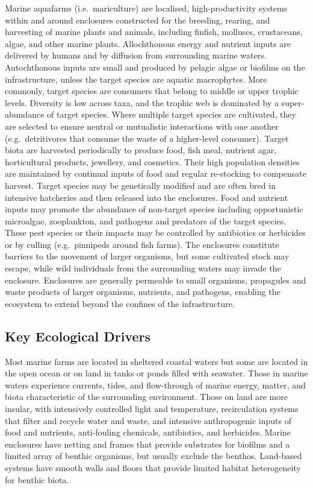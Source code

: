 \documentclass[
  letterpaper,
  DIV=11,
  numbers=noendperiod]{scrartcl}
\begin{document}
Marine aquafarms (i.e.~mariculture) are localised, high-productivity
systems within and around enclosures constructed for the breeding,
rearing, and harvesting of marine plants and animals, including finfish,
molluscs, crustaceans, algae, and other marine plants. Allochthonous
energy and nutrient inputs are delivered by humans and by diffusion from
surrounding marine waters. Autochthonous inputs are small and produced
by pelagic algae or biofilms on the infrastructure, unless the target
species are aquatic macrophytes. More commonly, target species are
consumers that belong to middle or upper trophic levels. Diversity is
low across taxa, and the trophic web is dominated by a super-abundance
of target species. Where multiple target species are cultivated, they
are selected to ensure neutral or mutualistic interactions with one
another (e.g.~detritivores that consume the waste of a higher-level
consumer). Target biota are harvested periodically to produce food, fish
meal, nutrient agar, horticultural products, jewellery, and cosmetics.
Their high population densities are maintained by continual inputs of
food and regular re-stocking to compensate harvest. Target species may
be genetically modified and are often bred in intensive hatcheries and
then released into the enclosures. Food and nutrient inputs may promote
the abundance of non-target species including opportunistic microalgae,
zooplankton, and pathogens and predators of the target species. These
pest species or their impacts may be controlled by antibiotics or
herbicides or by culling (e.g.~pinnipeds around fish farms). The
enclosures constitute barriers to the movement of larger organisms, but
some cultivated stock may escape, while wild individuals from the
surrounding waters may invade the enclosure. Enclosures are generally
permeable to small organisms, propagules and waste products of larger
organisms, nutrients, and pathogens, enabling the ecosystem to extend
beyond the confines of the infrastructure.

\subsection{Key Ecological Drivers}\label{key-ecological-drivers-48}

Most marine farms are located in sheltered coastal waters but some are
located in the open ocean or on land in tanks or ponds filled with
seawater. Those in marine waters experience currents, tides, and
flow-through of marine energy, matter, and biota characteristic of the
surrounding environment. Those on land are more insular, with
intensively controlled light and temperature, recirculation systems that
filter and recycle water and waste, and intensive anthropogenic inputs
of food and nutrients, anti-fouling chemicals, antibiotics, and
herbicides. Marine enclosures have netting and frames that provide
substrates for biofilms and a limited array of benthic organisms, but
usually exclude the benthos. Land-based systems have smooth walls and
floors that provide limited habitat heterogeneity for benthic biota.
\end{document}
